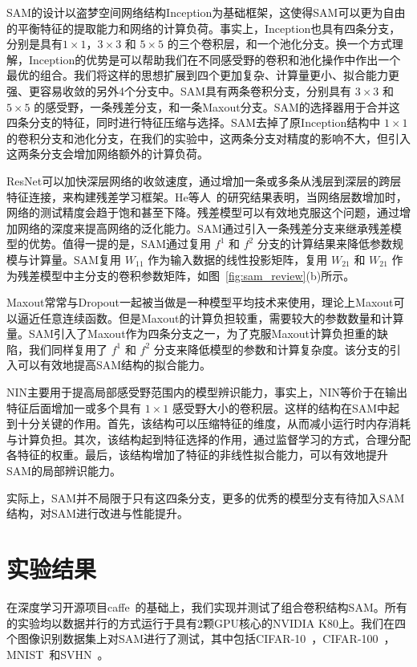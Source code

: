 SAM的设计以盗梦空间网络结构Inception为基础框架，这使得SAM可以更为自由的平衡特征的提取能力和网络的计算负荷。事实上，Inception也具有四条分支，分别是具有$1\times1$，$3\times3$ 和 $5\times5$ 的三个卷积层，和一个池化分支。换一个方式理解，Inception的优势是可以帮助我们在不同感受野的卷积和池化操作中作出一个最优的组合。我们将这样的思想扩展到四个更加复杂、计算量更小、拟合能力更强、更容易收敛的另外4个分支中。SAM具有两条卷积分支，分别具有 $3\times3$ 和 $5\times5$ 的感受野，一条残差分支，和一条Maxout分支。SAM的选择器用于合并这四条分支的特征，同时进行特征压缩与选择。SAM去掉了原Inception结构中 $1\times1$ 的卷积分支和池化分支，在我们的实验中，这两条分支对精度的影响不大，但引入这两条分支会增加网络额外的计算负荷。

ResNet可以加快深层网络的收敛速度，通过增加一条或多条从浅层到深层的跨层特征连接，来构建残差学习框架。He等人~\cite{he2015deep}的研究结果表明，当网络层数增加时，网络的测试精度会趋于饱和甚至下降。残差模型可以有效地克服这个问题，通过增加网络的深度来提高网络的泛化能力。SAM通过引入一条残差分支来继承残差模型的优势。值得一提的是，SAM通过复用 $f^{1}$ 和 $f^{2}$ 分支的计算结果来降低参数规模与计算量。SAM复用 $W_{11}$ 作为输入数据的线性投影矩阵，复用 $W_{21}$ 和 $W_{21}$ 作为残差模型中主分支的卷积参数矩阵，如图~\ref{fig:sam_review}(b)所示。

Maxout常常与Dropout一起被当做是一种模型平均技术来使用，理论上Maxout可以逼近任意连续函数。但是Maxout的计算负担较重，需要较大的参数数量和计算量。SAM引入了Maxout作为四条分支之一，为了克服Maxout计算负担重的缺陷，我们同样复用了 $f^{1}$ 和 $f^{2}$ 分支来降低模型的参数和计算复杂度。该分支的引入可以有效地提高SAM结构的拟合能力。

NIN主要用于提高局部感受野范围内的模型辨识能力，事实上，NIN等价于在输出特征后面增加一或多个具有 $1{\times}1$ 感受野大小的卷积层。这样的结构在SAM中起到十分关键的作用。首先，该结构可以压缩特征的维度，从而减小运行时内存消耗与计算负担。其次，该结构起到特征选择的作用，通过监督学习的方式，合理分配各特征的权重。最后，该结构增加了特征的非线性拟合能力，可以有效地提升SAM的局部辨识能力。

实际上，SAM并不局限于只有这四条分支，更多的优秀的模型分支有待加入SAM结构，对SAM进行改进与性能提升。

\section{实验结果}
\label{sec:sap:experiment}

在深度学习开源项目caffe~\cite{jia2014caffe}的基础上，我们实现并测试了组合卷积结构SAM。所有的实验均以数据并行的方式运行于具有2颗GPU核心的NVIDIA K80上。我们在四个图像识别数据集上对SAM进行了测试，其中包括CIFAR-10~\cite{krizhevsky2009learning}，CIFAR-100~\cite{krizhevsky2009learning}，MNIST~\cite{lecun1998gradient}和SVHN~\cite{netzer2011reading}。

